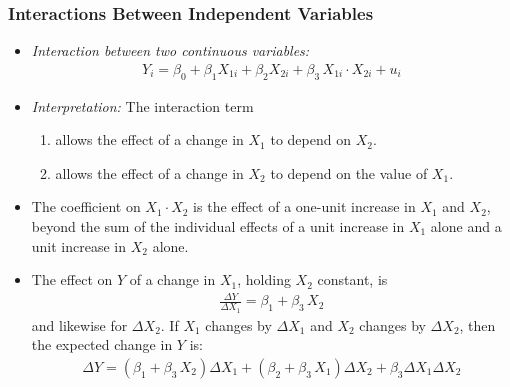 \begin{frame}
\frametitle{Interactions Between Independent Variables}
\begin{itemize}
\item \emph{Interaction between two continuous variables:} 
\begin{align*}
Y_{i} = \beta_{0} + \beta_{1} X_{1i} + \beta_{2} X_{2i} + \beta_{3}\, X_{1i} \cdot X_{2i} + u_{i}
\end{align*}
\item \emph{Interpretation:} The interaction term
\begin{enumerate}
\item allows the effect of a change in $X_{1}$ to depend on $X_{2}$.
\item allows the effect of a change in $X_{2}$ to depend on the value of $X_{1}$.
\end{enumerate}
\item The coefficient on $X_{1} \cdot X_{2}$ is the effect of a one-unit increase in $X_{1}$ and $X_{2}$, beyond the sum of the individual effects of a unit increase in $X_{1}$ alone and a unit increase in $X_{2}$ alone.
\item The effect on $Y$ of a change in $X_{1}$, holding $X_{2}$ constant, is
\begin{align*}
\frac{\Delta Y}{\Delta X_{1}} = \beta_{1} + \beta_{3}\, X_{2}
\end{align*}
and likewise for $\Delta X_{2}$.
If $X_{1}$ changes by $\Delta X_{1}$ and $X_{2}$ changes by $\Delta X_{2}$, then the expected change in $Y$ is:
\begin{align*}
\Delta Y = (\beta_{1} + \beta_{3}\, X_{2}) \Delta X_{1} 
         + (\beta_{2} + \beta_{3}\, X_{1}) \Delta X_{2} 
         + \beta_{3} \Delta X_{1} \Delta X_{2} 
\end{align*}
\end{itemize}
\end{frame}

